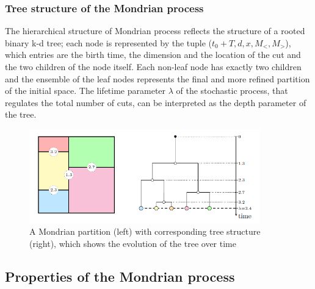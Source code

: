 \documentclass[a4paper]{article}
\begin{document}
\subsubsection*{Tree structure of the Mondrian process}

The hierarchical structure of Mondrian process reflects the structure of a rooted binary k-d tree;
each node is represented by the tuple ($t_0+T,d,x,M_<,M_>$), which entries are the birth time, the dimension and the location of the cut and the two children of the node itself.
Each non-leaf node has exactly two children and the ensemble of the leaf nodes represents the final and more refined partition of the initial space.
The lifetime parameter $\lambda$ of the stochastic process, that regulates the total number of cuts, can be interpreted as the depth parameter of the tree.



\begin{figure}[H]
        \centering
        \includegraphics[width=10cm]{grafici/MP.png}
\caption{A Mondrian partition (left) with corresponding tree structure (right),
which shows the evolution of the tree over time \cite{mourtada2019minimax}}
        \label{MP}
    \end{figure}   






\subsection{Properties of the Mondrian process}





\end{document}
